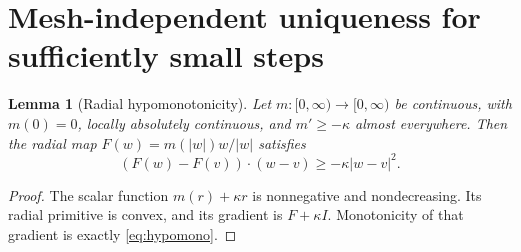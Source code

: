 \documentclass[11pt,a4paper]{article}
\newtheorem{lemma}[theorem]{Lemma}
\theoremstyle{definition}\newtheorem{definition}[theorem]{Definition}
\theoremstyle{remark}\newtheorem{remark}[theorem]{Remark}
\numberwithin{equation}{section}
\begin{document}
\section{Mesh-independent uniqueness for sufficiently small steps}\label{sec:unique}
\begin{lemma}[Radial hypomonotonicity]\label{lem:radial}
Let $m:[0,\infty)\to[0,\infty)$ be continuous, with $m(0)=0$, locally absolutely continuous, and $m'\ge-\kappa$ almost everywhere. Then the radial map $F(w)=m(|w|)w/|w|$ satisfies
\begin{equation}\label{eq:hypomono}
 (F(w)-F(v))\cdot(w-v)\ge-\kappa|w-v|^2.
\end{equation}
\end{lemma}
\begin{proof}
The scalar function $m(r)+\kappa r$ is nonnegative and nondecreasing. Its radial primitive is convex, and its gradient is $F+\kappa I$. Monotonicity of that gradient is exactly \eqref{eq:hypomono}.
\end{proof}
\end{document}
